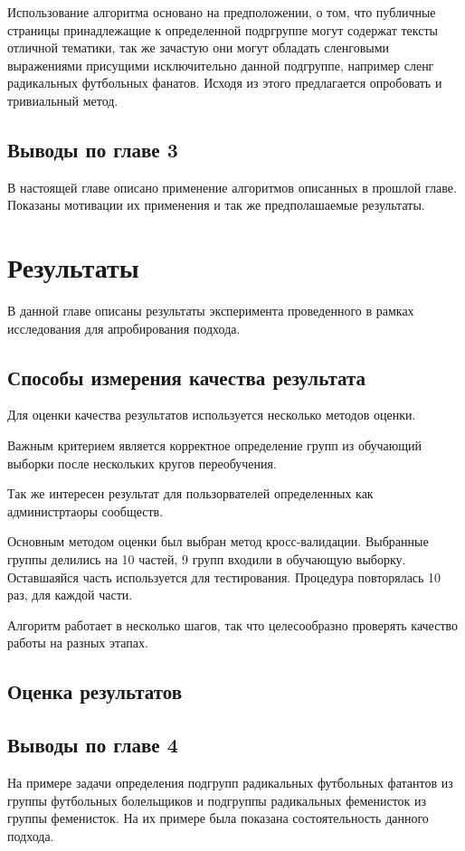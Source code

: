 \documentclass[annotation,times,page4]{itmo-student-thesis}
\begin{document}
Использование алгоритма основано на предположении, о том, что публичные страницы принадлежащие к определенной подргруппе могут содержат тексты отличной тематики, так же зачастую они могут обладать сленговыми выражениями присущими исключительно данной подгруппе, например сленг радикальных футбольных фанатов. Исходя из этого предлагается опробовать и тривиальный метод.
 
\section{Выводы по главе 3}
В настоящей главе описано применение алгоритмов описанных в прошлой главе. Показаны мотивации их применения и так же предполашаемые результаты.
\chapter{Результаты}
В данной главе описаны результаты эксперимента проведенного в рамках исследования для апробирования подхода.
\section{Способы измерения качества результата}
Для оценки качества результатов используется несколько методов оценки.

Важным критерием является корректное определение групп из обучающий выборки после нескольких кругов переобучения. 

Так же интересен результат для пользорвателей определенных как администртаоры сообществ.

Основным методом оценки был выбран метод кросс-валидации. Выбранные группы делились на 10 частей, 9 групп входили в обучающую выборку. Оставшаяйся часть используется для тестирования. Процедура повторялась 10 раз, для каждой части.


Алгоритм работает в несколько шагов, так что целесообразно проверять качество работы на разных этапах.
\section{Оценка результатов}
\section{Выводы по главе 4}
На примере задачи определения подгрупп радикальных футбольных фатантов из группы футбольных болельщиков и подгруппы радикальных феменисток из группы феменисток. На их примере была показана состоятельность данного подхода. 
\end{document}
